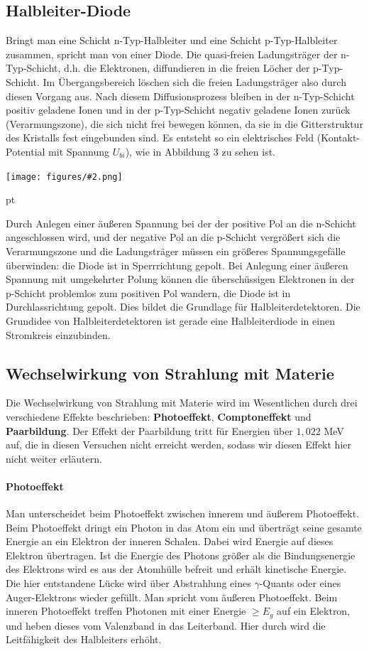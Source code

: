 \documentclass[12pt]{article}
\newcommand{\gra}[3][0.7]{
	\begin{minipage}[h!]{\textwidth}
		\centering
		\texttt{[image: figures/\#2.png]}
		\captionof{figure}{#3}
	\end{minipage}
	\vskip 30 pt
	}
\begin{document}
\subsection{Halbleiter-Diode}

Bringt man eine Schicht n-Typ-Halbleiter und eine Schicht p-Typ-Halbleiter zusammen, spricht man von einer Diode. Die quasi-freien Ladungsträger der n-Typ-Schicht, d.h. die Elektronen, diffundieren in die freien Löcher der p-Typ-Schicht. Im Übergangsbereich löschen sich die freien Ladungsträger also durch diesen Vorgang aus. 
Nach diesem Diffusionsprozess bleiben in der n-Typ-Schicht positiv geladene Ionen und in der p-Typ-Schicht negativ geladene Ionen zurück (Verarmungszone), die sich nicht frei bewegen können, da sie in die Gitterstruktur des Kristalls fest eingebunden sind. Es entsteht so ein elektrisches Feld (Kontakt-Potential mit Spannung $U_{bi}$), wie in Abbildung 3 zu sehen ist. 

\gra{n-p-Diode}{Halbleiter-Diode} \cite{staat}

Durch Anlegen einer äußeren Spannung bei der der positive Pol an die n-Schicht angeschlossen wird, und der negative Pol an die p-Schicht vergrößert sich die Verarmungszone und die Ladungsträger müssen ein größeres Spannungsgefälle überwinden: die Diode ist in Sperrrichtung gepolt. Bei Anlegung einer äußeren Spannung mit umgekehrter Polung können die überschüssigen Elektronen in der p-Schicht problemlos zum positiven Pol wandern, die Diode ist in Durchlassrichtung gepolt.
Dies bildet die Grundlage für Halbleiterdetektoren. Die Grundidee von Halbleiterdetektoren ist gerade eine Halbleiterdiode in einen Stromkreis einzubinden.
\subsection{Wechselwirkung von Strahlung mit Materie \cite{anleitungkhwz}}

Die Wechselwirkung von Strahlung mit Materie wird im Wesentlichen durch drei verschiedene Effekte beschrieben: \textbf{Photoeffekt}, \textbf{Comptoneffekt} und \textbf{Paarbildung}.
Der Effekt der Paarbildung tritt für Energien über $1,022$ MeV auf, die in diesen Versuchen nicht erreicht werden, sodass wir diesen Effekt hier nicht weiter erläutern.

\paragraph{Photoeffekt} Man unterscheidet beim Photoeffekt zwischen innerem und äußerem Photoeffekt.
Beim Photoeffekt dringt ein Photon in das Atom ein und überträgt seine gesamte Energie an ein Elektron der inneren Schalen. Dabei wird Energie auf dieses Elektron übertragen. Ist die Energie des Photons größer als die Bindungsenergie des Elektrons wird es aus der Atomhülle befreit und erhält kinetische Energie. Die hier entstandene Lücke wird über Abstrahlung eines $\gamma$-Quants oder eines Auger-Elektrons wieder gefüllt. Man spricht vom äußeren Photoeffekt.
Beim inneren Photoeffekt treffen Photonen mit einer Energie  $\geq E_g$ auf ein Elektron, und heben dieses vom Valenzband in das Leiterband. Hier durch wird die Leitfähigkeit des Halbleiters erhöht.
\end{document}
